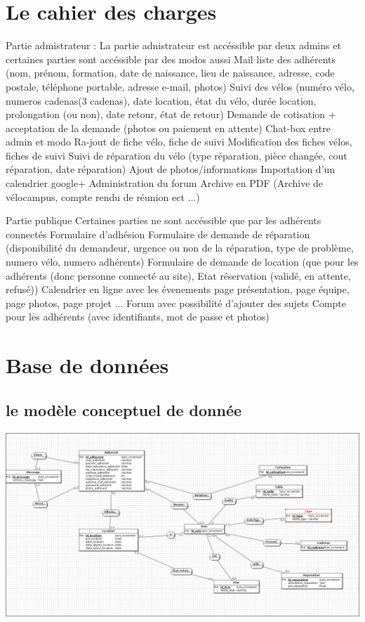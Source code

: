 \documentclass[11pt,a4paper,titlepage]{report}
\begin{document}
\chapter{Le cahier des charges}
Partie admistrateur :  
La partie adnistrateur est accéssible par deux admins et certaines parties sont accéssible par des modos aussi    
 Mail liste des adhérents  
(nom, prénom, formation, date de naissance, lieu de naissance, adresse, code postale, téléphone portable, adresse e-mail, photos)
  Suivi des vélos  
(numéro vélo, numeros cadenas(3 cadenas), date location, état du vélo, durée location, prolongation (ou non), date retour, état de retour)
  Demande de cotisation + acceptation de la demande
(photos ou paiement en attente)
  Chat-box entre admin et modo
  Ra-jout de fiche vélo, fiche de suivi 
 Modification des fiches vélos, fiches de suivi
  Suivi de réparation du vélo  
(type réparation, pièce changée, cout réparation, date réparation)
  Ajout de photos/informations
  Importation d'un calendrier google+
 Administration du forum
  Archive en PDF
(Archive de vélocampus, compte rendu de réunion ect ...)


Partie publique
Certaines parties ne sont accéssible que par les adhérents connectés 
 Formulaire d'adhésion
 Formulaire de demande de réparation  
(disponibilité du demandeur, urgence ou non de la réparation, type de problème, numero vélo, numero adhérents)
 Formulaire de demande de location  
(que pour les adhérents (donc personne connecté au site), Etat réservation (validé, en attente, refusé))
  Calendrier en ligne avec les évenements
  page présentation, page équipe, page photos, page projet ...
  Forum avec possibilité d'ajouter des sujets
  Compte pour les adhérents  
(avec identifiants, mot de passe et photos)

\chapter{Base de données}
\section{le modèle conceptuel de donnée}
\begin{center}
\includegraphics[width=1\textwidth]{MCD.jpg}~
\end{center}
\end{document}
